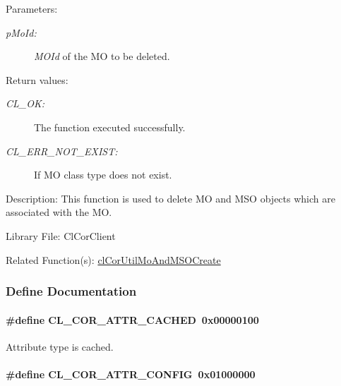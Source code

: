 \begin{Desc}
\item[Parameters:]
\begin{description}
\item[{\em p\-Mo\-Id:}]{\em MOId\/} of the MO to be deleted.\end{description}
\end{Desc}
\begin{Desc}
\item[Return values:]
\begin{description}
\item[{\em CL\_\-OK:}]The function executed successfully. \item[{\em CL\_\-ERR\_\-NOT\_\-EXIST:}]If MO class type does not exist.\end{description}
\end{Desc}
\begin{Desc}
\item[Description:]This function is used to delete MO and MSO objects which are associated with the MO.\end{Desc}
\begin{Desc}
\item[Library File:]Cl\-Cor\-Client\end{Desc}
\begin{Desc}
\item[Related Function(s):]\hyperlink{group__group13}{cl\-Cor\-Util\-Mo\-And\-MSOCreate} \end{Desc}


\subsubsection{Define Documentation}
\hypertarget{group__group13_ga310}{
\paragraph[CL\_\-COR\_\-ATTR\_\-CACHED]{\setlength{\rightskip}{0pt plus 5cm}\#define CL\_\-COR\_\-ATTR\_\-CACHED~0x00000100}\hfill}
\label{group__group13_ga310}


Attribute type is cached. \hypertarget{group__group13_ga303}{
\paragraph[CL\_\-COR\_\-ATTR\_\-CONFIG]{\setlength{\rightskip}{0pt plus 5cm}\#define CL\_\-COR\_\-ATTR\_\-CONFIG~0x01000000}\hfill}
\label{group__group13_ga303}


